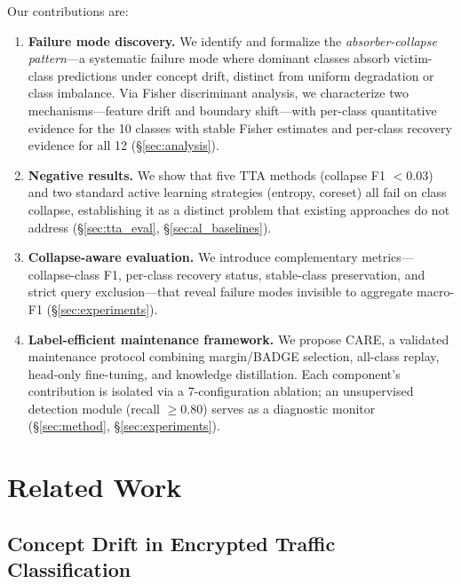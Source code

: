 \documentclass[journal]{IEEEtran}
\newcommand{\ours}{CARE}  %
\begin{document}
Our contributions are:
\begin{enumerate}
  \item \textbf{Failure mode discovery.} We identify and formalize the \textit{absorber-collapse pattern}---a systematic failure mode where dominant classes absorb victim-class predictions under concept drift, distinct from uniform degradation or class imbalance. Via Fisher discriminant analysis, we characterize two mechanisms---feature drift and boundary shift---with per-class quantitative evidence for the 10 classes with stable Fisher estimates and per-class recovery evidence for all 12 (\S\ref{sec:analysis}).
  \item \textbf{Negative results.} We show that five TTA methods (collapse F1 ${<}0.03$) and two standard active learning strategies (entropy, coreset) all fail on class collapse, establishing it as a distinct problem that existing approaches do not address (\S\ref{sec:tta_eval}, \S\ref{sec:al_baselines}).
  \item \textbf{Collapse-aware evaluation.} We introduce complementary metrics---collapse-class F1, per-class recovery status, stable-class preservation, and strict query exclusion---that reveal failure modes invisible to aggregate macro-F1 (\S\ref{sec:experiments}).
  \item \textbf{Label-efficient maintenance framework.} We propose \ours{}, a validated maintenance protocol combining margin/BADGE selection, all-class replay, head-only fine-tuning, and knowledge distillation. Each component's contribution is isolated via a 7-configuration ablation; an unsupervised detection module (recall $\geq$0.80) serves as a diagnostic monitor (\S\ref{sec:method}, \S\ref{sec:experiments}).
\end{enumerate}


\section{Related Work}
\label{sec:related}

\subsection{Concept Drift in Encrypted Traffic Classification}
\end{document}
